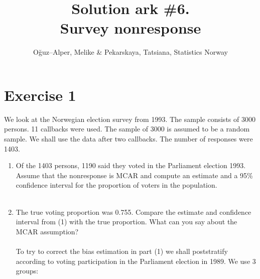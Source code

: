\documentclass[12pt]{article}
\begin{document}
\title{Solution ark \#6.\\ Survey nonresponse}
\author{O\u{g}uz--Alper, Melike \& Pekarskaya, Tatsiana, Statistics Norway}
\maketitle

\section*{Exercise 1}
We look at the Norwegian election survey from 1993. The sample consists of 3000 persons. 11 callbacks were used. The sample of 3000 is assumed to be a random sample.  We shall use the data after two callbacks. The number of responses were 1403.
\begin{enumerate}
\item Of the 1403 persons, 1190 said they voted in the Parliament election 1993. Assume that the nonresponse is MCAR and compute an estimate and a 95\% confidence interval for the proportion of voters in the population. \\
\\
\item The true voting proportion was 0.755. Compare the estimate and confidence interval from (1) with the true proportion. What can you say about the MCAR assumption?\\
\\
To try to correct the bias estimation in part (1) we shall poststratify according to voting participation in the Parliament election in 1989. We use 3 groups: 

\end{enumerate}
\end{document}
